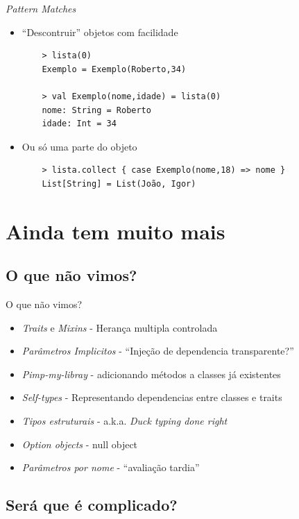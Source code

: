 \documentclass{beamer}
\begin{document}
\begin{frame}[fragile]{\emph{Pattern Matches}} 
    \begin{itemize} %
	\item ``Descontruir'' objetos com facilidade
	\begin{lstlisting}	
	> lista(0)
	Exemplo = Exemplo(Roberto,34)
	
	> val Exemplo(nome,idade) = lista(0)
	nome: String = Roberto
	idade: Int = 34
	\end{lstlisting}
	
	\item Ou só uma parte do objeto
	\begin{lstlisting}	
	> lista.collect { case Exemplo(nome,18) => nome }
	List[String] = List(João, Igor)	
	\end{lstlisting}
    \end{itemize}
\end{frame}


\section{Ainda tem muito mais}

\subsection{O que não vimos?}

\begin{frame}{O que não vimos?}
	\begin{itemize} %
	\item \emph{Traits} e \emph{Mixins} - Herança multipla controlada
	\item \emph{Parâmetros Implicitos} - ``Injeção de dependencia transparente?''
	\item \emph{Pimp-my-libray} - adicionando métodos a classes já existentes
	\item \emph{Self-types} - Representando dependencias entre classes e traits 
	\item \emph{Tipos estruturais} - a.k.a. \emph{Duck typing done right}
	\item \emph{Option objects} - null object
	\item \emph{Parâmetros por nome} - ``avaliação tardia''
	\end{itemize}
\end{frame}

\subsection{Será que é complicado?}
\end{document}
